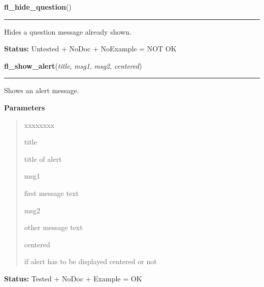 \hspace{.8\funcindent}\begin{boxedminipage}{\funcwidth}

    \raggedright \textbf{fl\_hide\_question}()

    \vspace{-1.5ex}

    \rule{\textwidth}{0.5\fboxrule}
\setlength{\parskip}{2ex}
    Hides a question message already shown.

\setlength{\parskip}{1ex}
\textbf{Status:} Untested + NoDoc + NoExample = NOT OK



    \end{boxedminipage}

    \label{xformslib:library:fl_show_alert}

    \vspace{0.5ex}

\hspace{.8\funcindent}\begin{boxedminipage}{\funcwidth}

    \raggedright \textbf{fl\_show\_alert}(\textit{title}, \textit{msg1}, \textit{msg2}, \textit{centered})

    \vspace{-1.5ex}

    \rule{\textwidth}{0.5\fboxrule}
\setlength{\parskip}{2ex}
    Shows an alert message.

\setlength{\parskip}{1ex}
      \textbf{Parameters}
      \vspace{-1ex}

      \begin{quote}
        \begin{Ventry}{xxxxxxxx}

          \item[title]

          title of alert

          \item[msg1]

          first message text

          \item[msg2]

          other message text

          \item[centered]

          if alert has to be displayed centered or not

        \end{Ventry}

      \end{quote}

\textbf{Status:} Tested + NoDoc + Example = OK



    \end{boxedminipage}

